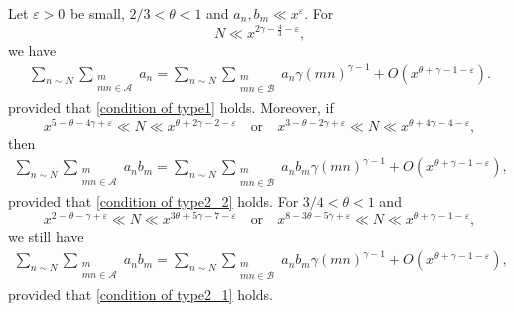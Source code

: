 \documentclass[10pt,a4paper]{amsart}
\newcommand{\cA}{\ensuremath{\mathcal{A}}}
\newcommand{\cB}{\ensuremath{\mathcal{B}}}
\begin{document}
\begin{lemma}\label{harman sieve type I II information}
Let $\varepsilon>0$ be small, $2/3 < \theta < 1$ and $a_n,b_m \ll x^{\varepsilon}$. For
$$
N \ll x^{2\gamma -\frac{4}{3} -\varepsilon},
$$
we have 
\begin{align}\label{harman sieve type I}
\sum_{n \sim N} \sum_{\substack{m \\ mn \in \cA}} a_n  = \sum_{n \sim N} \sum_{\substack{m \\ mn \in \cB}} a_n \gamma (mn)^{\gamma-1} + O(x^{\theta + \gamma - 1 -\varepsilon}).
\end{align}
provided that \eqref{condition of type1} holds.
Moreover, if
$$
x^{5-\theta-4\gamma +\varepsilon}\ll N \ll x^{\theta+2\gamma-2-\varepsilon} \quad \text{or} \quad x^{3-\theta-2\gamma+\varepsilon} \ll N \ll x^{\theta + 4\gamma -4-\varepsilon},
$$
then
\begin{align}\label{harman sieve type II_2}
	\sum_{n \sim N} \sum_{\substack{m \\ mn \in \cA}} a_n b_m  = \sum_{n \sim N} \sum_{\substack{m \\ mn \in \cB}} a_n b_m \gamma (mn)^{\gamma-1} + O(x^{\theta + \gamma - 1 - \varepsilon}),
\end{align}
provided that \eqref{condition of type2_2} holds. For $3/4 < \theta <1$ and
$$
x^{2-\theta-\gamma +\varepsilon}\ll N \ll x^{3\theta+5\gamma-7-\varepsilon} \quad \text{or} \quad x^{8-3\theta-5\gamma+\varepsilon} \ll N \ll x^{\theta + \gamma -1-\varepsilon},
$$ 
we still have
\begin{align}\label{harman sieve type II_1}
	\sum_{n \sim N} \sum_{\substack{m \\ mn \in \cA}} a_n b_m  = \sum_{n \sim N} \sum_{\substack{m \\ mn \in \cB}} a_n b_m \gamma (mn)^{\gamma-1} + O(x^{\theta + \gamma - 1 - \varepsilon}),
\end{align}
provided that \eqref{condition of type2_1} holds.
\end{lemma}
\end{document}
